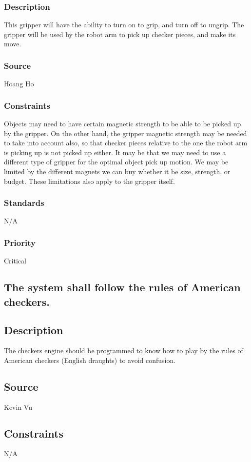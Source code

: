 \subsubsection{Description}
This gripper will have the ability to turn on to grip, and turn off to ungrip. The gripper will be used by the robot arm to pick up checker pieces, and make its move.
\subsubsection{Source}
Hoang Ho
\subsubsection{Constraints}
Objects may need to have certain magnetic strength to be able to be picked up by the gripper. On the other hand, the gripper magnetic strength may be needed to take into account also, so that checker pieces relative to the one the robot arm is picking up is not picked up either. It may be that we may need to use a different type of gripper for the optimal object pick up motion. We may be limited by the different magnets we can buy whether it be size, strength, or budget. These limitations also apply to the gripper itself.
\subsubsection{Standards}
N/A
\subsubsection{Priority}
Critical

\subsection{The system shall follow the rules of American checkers.}
\subsection{Description}
The checkers engine should be programmed to know how to play by the rules of American checkers (English draughts) to avoid confusion.
\subsection{Source}
Kevin Vu
\subsection{Constraints}
N/A
